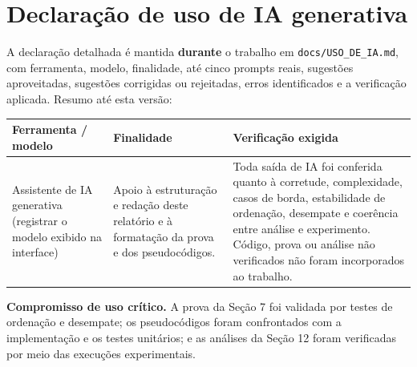 \documentclass[11pt,a4paper]{article}
\begin{document}
\section{Declaração de uso de IA generativa}
A declaração detalhada é mantida \textbf{durante} o trabalho em \texttt{docs/USO\_DE\_IA.md}, com
ferramenta, modelo, finalidade, até cinco prompts reais, sugestões aproveitadas, sugestões corrigidas
ou rejeitadas, erros identificados e a verificação aplicada. Resumo até esta versão:
\begin{table}[h]
\small\centering
\begin{tabularx}{\textwidth}{@{}p{3.4cm}YY@{}}
\toprule
\textbf{Ferramenta / modelo} & \textbf{Finalidade} & \textbf{Verificação exigida}\\
\midrule
Assistente de IA generativa (registrar o modelo exibido na interface) &
Apoio à estruturação e redação deste relatório e à formatação da prova e dos pseudocódigos. &
Toda saída de IA foi conferida quanto à corretude, complexidade, casos de borda,
estabilidade de ordenação, desempate e coerência entre análise e experimento.
Código, prova ou análise não verificados não foram incorporados ao trabalho.\\
\bottomrule
\end{tabularx}
\end{table}
\begin{nota}
\textbf{Compromisso de uso crítico.}
A prova da Seção 7 foi validada por testes de ordenação e desempate;
os pseudocódigos foram confrontados com a implementação e os testes unitários;
e as análises da Seção 12 foram verificadas por meio das execuções experimentais.
\end{nota}

\end{document}
